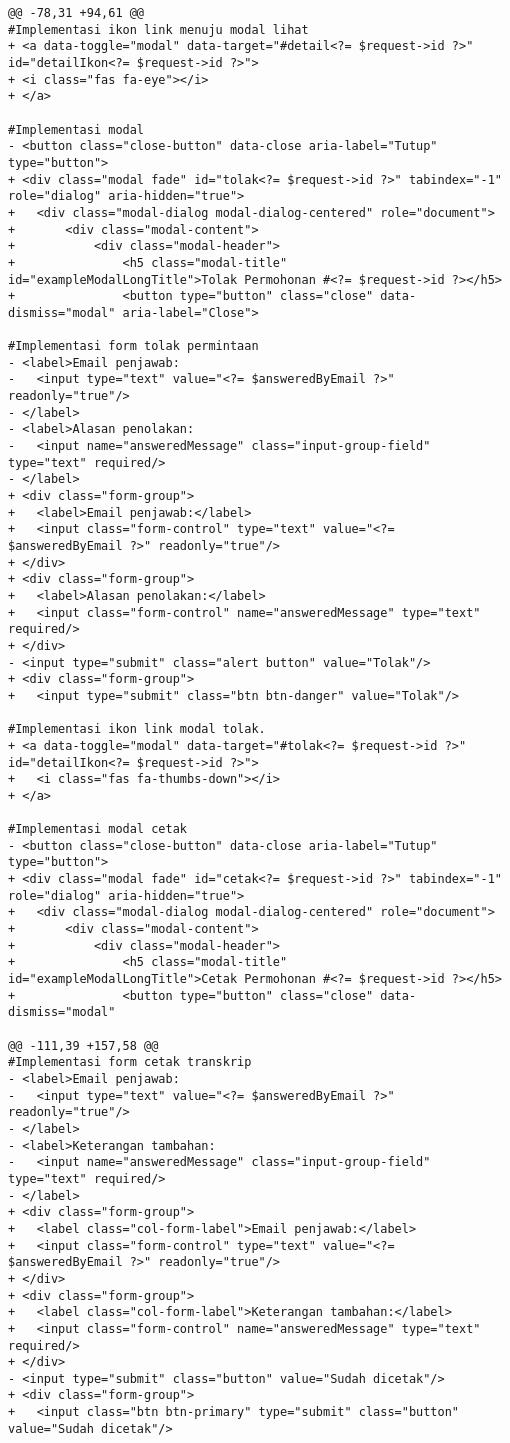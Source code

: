 \begin{lstlisting}
@@ -78,31 +94,61 @@
#Implementasi ikon link menuju modal lihat
+ <a data-toggle="modal" data-target="#detail<?= $request->id ?>" id="detailIkon<?= $request->id ?>">
+ <i class="fas fa-eye"></i>
+ </a>

#Implementasi modal
- <button class="close-button" data-close aria-label="Tutup" type="button">
+ <div class="modal fade" id="tolak<?= $request->id ?>" tabindex="-1" role="dialog" aria-hidden="true">
+ 	<div class="modal-dialog modal-dialog-centered" role="document">
+ 		<div class="modal-content">
+ 			<div class="modal-header">
+ 				<h5 class="modal-title" id="exampleModalLongTitle">Tolak Permohonan #<?= $request->id ?></h5>
+ 				<button type="button" class="close" data-dismiss="modal" aria-label="Close">

#Implementasi form tolak permintaan
- <label>Email penjawab:
- 	<input type="text" value="<?= $answeredByEmail ?>" readonly="true"/>
- </label>
- <label>Alasan penolakan:
- 	<input name="answeredMessage" class="input-group-field" type="text" required/>
- </label>
+ <div class="form-group">
+ 	<label>Email penjawab:</label>
+ 	<input class="form-control" type="text" value="<?= $answeredByEmail ?>" readonly="true"/>
+ </div>
+ <div class="form-group">
+ 	<label>Alasan penolakan:</label>
+ 	<input class="form-control" name="answeredMessage" type="text" required/>
+ </div>                                          
- <input type="submit" class="alert button" value="Tolak"/>
+ <div class="form-group">
+ 	<input type="submit" class="btn btn-danger" value="Tolak"/>

#Implementasi ikon link modal tolak.
+ <a data-toggle="modal" data-target="#tolak<?= $request->id ?>" id="detailIkon<?= $request->id ?>">
+ 	<i class="fas fa-thumbs-down"></i>
+ </a>

#Implementasi modal cetak
- <button class="close-button" data-close aria-label="Tutup" type="button">
+ <div class="modal fade" id="cetak<?= $request->id ?>" tabindex="-1" role="dialog" aria-hidden="true">
+ 	<div class="modal-dialog modal-dialog-centered" role="document">
+ 		<div class="modal-content">
+ 			<div class="modal-header">
+ 				<h5 class="modal-title" id="exampleModalLongTitle">Cetak Permohonan #<?= $request->id ?></h5>
+ 				<button type="button" class="close" data-dismiss="modal" 

@@ -111,39 +157,58 @@
#Implementasi form cetak transkrip
- <label>Email penjawab:
- 	<input type="text" value="<?= $answeredByEmail ?>" readonly="true"/>
- </label>
- <label>Keterangan tambahan:
- 	<input name="answeredMessage" class="input-group-field" type="text" required/>
- </label>
+ <div class="form-group">
+ 	<label class="col-form-label">Email penjawab:</label>
+ 	<input class="form-control" type="text" value="<?= $answeredByEmail ?>" readonly="true"/>
+ </div>
+ <div class="form-group">
+ 	<label class="col-form-label">Keterangan tambahan:</label>
+ 	<input class="form-control" name="answeredMessage" type="text" required/>
+ </div>                                            
- <input type="submit" class="button" value="Sudah dicetak"/>
+ <div class="form-group">
+ 	<input class="btn btn-primary" type="submit" class="button" value="Sudah dicetak"/>


\end{lstlisting}
